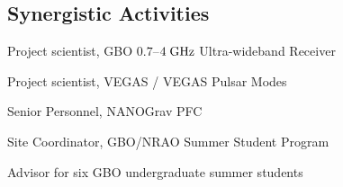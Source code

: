 \documentclass[10pt]{myNSF}
\begin{document}
\subsection*{\normalsize Synergistic Activities}
\vspace{-0.5em}

\begin{itemize*}
\item{Project scientist, GBO $0.7$--$4\; \textrm{GHz}$ Ultra-wideband
  Receiver}
\item{Project scientist, VEGAS / VEGAS Pulsar Modes}
\item{Senior Personnel, NANOGrav PFC}
\item{Site Coordinator, GBO/NRAO Summer Student Program}
\item{Advisor for six GBO undergraduate summer students}
\end{itemize*}
\end{document}
